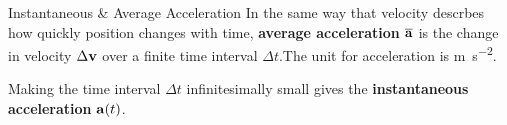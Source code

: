 \documentclass[12pt,compress,aspectratio=169]{beamer}
\newcommand{\mb}[1]{\ensuremath\mathbf{#1}}
\newcommand{\eq}[2]{\vspace{#1}{\Large\begin{displaymath}#2\end{displaymath}}}
\begin{document}


\begin{frame}{Instantaneous \& Average Acceleration}
  In the same way that velocity descrbes how quickly position changes with time, 
  \textbf{average acceleration} $\overline{\mb{a}}$ is the change in velocity
  $\Delta\mb{v}$ over a finite time interval $\Delta t$.The unit for acceleration
  is \si{\metre\per\second^2}.

  \eq{-.2in}{
    \boxed{
      \overline{\mb{a}} = \frac{\Delta\mb{v}}{\Delta t}
      =\frac{\mb{v}-\mb{v}_0}{\Delta t}
    }
  }
  
  Making the time interval $\Delta t$ infinitesimally small gives the
  \textbf{instantaneous acceleration} $\mb{a}(t)$.
\end{frame}



%
%
%
%
%
%    
%
%
\end{document}
